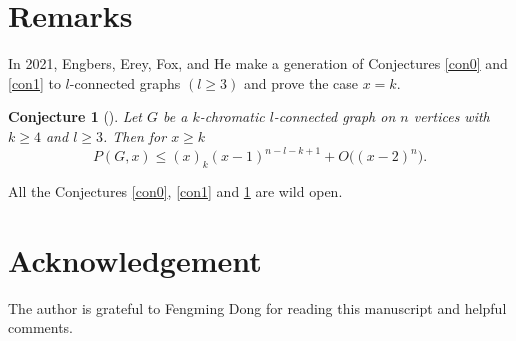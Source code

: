 \documentclass[12pt]{article}
\newtheorem{conjecture}[theorem]{Conjecture}
\theoremstyle{definition}
\begin{document}
\section{Remarks}

In 2021, Engbers, Erey, Fox, and He \cite{EEFH21} make a generation of Conjectures \ref{con0} and \ref{con1} to $l$-connected graphs $(l\geq 3)$ and prove the case $x=k$.

\begin{conjecture}[\cite{EEFH21}]\label{con2} Let $G$ be a $k$-chromatic $l$-connected graph on $n$ vertices with $k\geq 4$ and $l\geq 3$. Then for $x\geq k$
$$P(G,x)\leq (x)_k(x-1)^{n-l-k+1}+O\big((x-2)^n\big).$$
\end{conjecture}
All the Conjectures \ref{con0}, \ref{con1} and \ref{con2} are wild open.



\section*{Acknowledgement}
The author is grateful to Fengming Dong for reading this manuscript and helpful comments.
\end{document}
